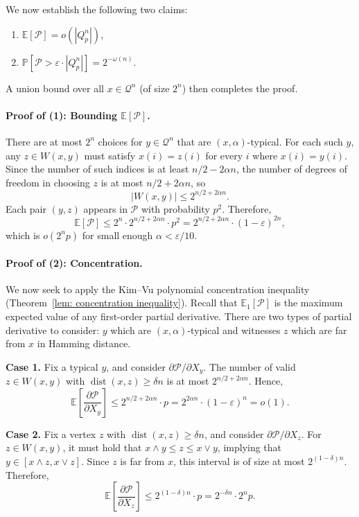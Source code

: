 \documentclass[11pt]{article}
\theoremstyle{definition}
\theoremstyle{plain}
\begin{document}
We now establish the following two claims:
\begin{enumerate}
    \item \( \mathbb{E}[\mathcal{P}] = o(|Q_p^n|) \),
    \item \( \mathbb{P}[\mathcal{P} > \varepsilon \cdot |Q_p^n|] = 2^{-\omega(n)} \).
\end{enumerate}

A union bound over all \( x \in \mathcal{Q}^n \) (of size \( 2^n \)) then completes the proof.

\paragraph{{\bf Proof of (1): Bounding \( \mathbb{E}[\mathcal{P}] \).}}
There are at most \( 2^n \) choices for \( y \in \mathcal{Q}^n \) that are \((x,\alpha)\)-typical. For each such \( y \), any \( z \in W(x, y) \) must satisfy \( x(i) = z(i) \) for every \( i \) where \( x(i) = y(i) \). Since the number of such indices is at least \( n/2 - 2\alpha n \), the number of degrees of freedom in choosing \( z \) is at most \( n/2 + 2\alpha n \), so
\[
|W(x, y)| \leq 2^{n/2 + 2\alpha n}.
\]
Each pair \( (y, z) \) appears in \( \mathcal{P} \) with probability \( p^2 \). Therefore,
\[
\mathbb{E}[\mathcal{P}] \leq 2^n \cdot 2^{n/2 + 2\alpha n} \cdot p^2 = 2^{n/2 + 2\alpha n} \cdot (1 - \varepsilon)^{2n},
\]
which is \( o(2^n p) \) for small enough \( \alpha < \varepsilon/10 \).

\paragraph{{\bf Proof of (2): Concentration.}} We now seek to apply the Kim–Vu polynomial concentration inequality (Theorem~\ref{lem: concentration inequality}). Recall that \( \mathbb{E}_1[\mathcal{P}] \) is the maximum expected value of any first-order partial derivative. There are two types of partial derivative to consider: $y$ which are $(x,\alpha)$-typical and witnesses $z$ which are far from $x$ in Hamming distance. 

\textbf{Case 1.} Fix a typical \( y \), and consider \( \partial \mathcal{P} / \partial X_y \). The number of valid \( z \in W(x, y) \) with \( \operatorname{dist}(x, z) \geq \delta n \) is at most \( 2^{n/2 + 2\alpha n} \). Hence,
\[
\mathbb{E}\left[\frac{\partial \mathcal{P}}{\partial X_y}\right] \leq 2^{n/2 + 2\alpha n} \cdot p = 2^{2\alpha n} \cdot (1 - \varepsilon)^n = o(1).
\]

\textbf{Case 2.} Fix a vertex \( z \) with \( \operatorname{dist}(x, z) \geq \delta n \), and consider \( \partial \mathcal{P} / \partial X_z \). For \( z \in W(x, y) \), it must hold that \( x \land y \leq z \leq x \lor y \), implying that \( y \in [x \land z, x \lor z] \). Since \( z\) is far from \( x \), this interval is of size at most \( 2^{(1 - \delta) n} \). Therefore,
\[
\mathbb{E}\left[\frac{\partial \mathcal{P}}{\partial X_z}\right] \leq 2^{(1 - \delta) n} \cdot p = 2^{-\delta n} \cdot 2^n p.
\]
\end{document}
